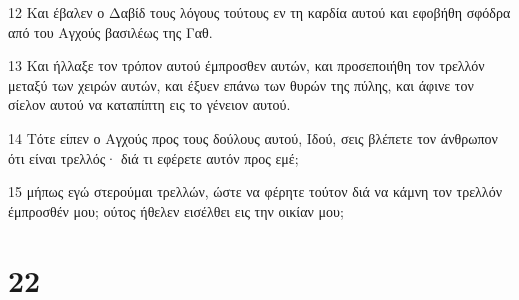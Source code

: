 \par 12 Και έβαλεν ο Δαβίδ τους λόγους τούτους εν τη καρδία αυτού και εφοβήθη σφόδρα από του Αγχούς βασιλέως της Γαθ.
\par 13 Και ήλλαξε τον τρόπον αυτού έμπροσθεν αυτών, και προσεποιήθη τον τρελλόν μεταξύ των χειρών αυτών, και έξυεν επάνω των θυρών της πύλης, και άφινε τον σίελον αυτού να καταπίπτη εις το γένειον αυτού.
\par 14 Τότε είπεν ο Αγχούς προς τους δούλους αυτού, Ιδού, σεις βλέπετε τον άνθρωπον ότι είναι τρελλός· διά τι εφέρετε αυτόν προς εμέ;
\par 15 μήπως εγώ στερούμαι τρελλών, ώστε να φέρητε τούτον διά να κάμνη τον τρελλόν έμπροσθέν μου; ούτος ήθελεν εισέλθει εις την οικίαν μου;

\chapter{22}

